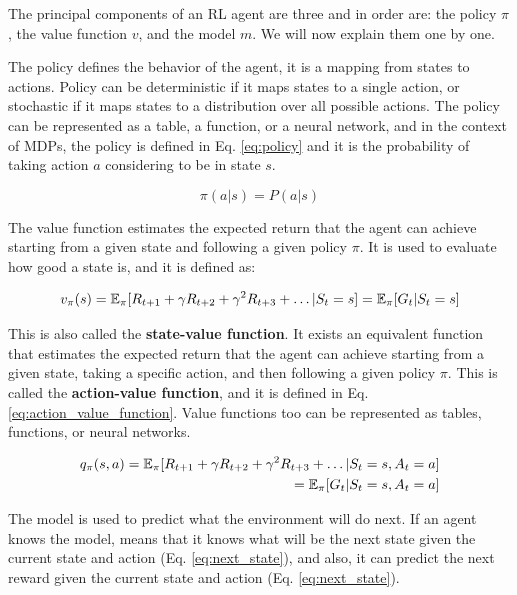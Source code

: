 The principal components of an RL agent are three and in order are: the policy $\pi$, the value function $v$, and the model $m$.
We will now explain them one by one.

The policy defines the behavior of the agent, it is a mapping from states to actions.
Policy can be deterministic if it maps states to a single action, or stochastic if it maps states to a distribution over all possible actions.
The policy can be represented as a table, a function, or a neural network, and in the context of MDPs, the policy is defined in Eq. \ref{eq:policy} and it is the probability of taking action $a$ considering to be in state $s$.

\begin{equation} \label{eq:policy}
    \pi(a|s) = P(a|s)
\end{equation}



The value function estimates the expected return that the agent can achieve starting from a given state and following a given policy $\pi$.
It is used to evaluate how good a state is, and it is defined as:

\begin{equation} \label{eq:value_function}
    v_{\pi}(s) = \operatorname{\mathbb{E}}_{\pi}[R_{t+1} + \gamma R_{t+2} + \gamma^2 R_{t+3} + \dots | S_t = s] = \operatorname{\mathbb{E}}_{\pi}[G_t | S_t = s]
\end{equation}

This is also called the \textbf{state-value function}.
It exists an equivalent function that estimates the expected return that the agent can achieve starting from a given state, taking a specific action, and then following a given policy $\pi$.
This is called the \textbf{action-value function}, and it is defined in Eq. \ref{eq:action_value_function}.
Value functions too can be represented as tables, functions, or neural networks.

\begin{equation} \label{eq:action_value_function}
\begin{split}
    q_{\pi}(s, a) = \operatorname{\mathbb{E}}_{\pi}[R_{t+1} + \gamma R_{t+2} + \gamma^2 R_{t+3} + \dots | S_t = s, A_t = a] \\
    = \operatorname{\mathbb{E}}_{\pi}[G_t | S_t = s, A_t = a]
\end{split}
\end{equation}


The model is used to predict what the environment will do next.
If an agent knows the model, means that it knows what will be the next state given the current state and action (Eq. \ref{eq:next_state}), and also, it can predict the next reward given the current state and action (Eq. \ref{eq:next_state}). 

